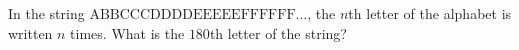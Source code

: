 In the string \(\mathrm{ABBCCCDDDDEEEEEFFFFFF}\ldots\), the \(n\)th letter of the alphabet is written \(n\) times. What is the \(180\)th letter of the string?

